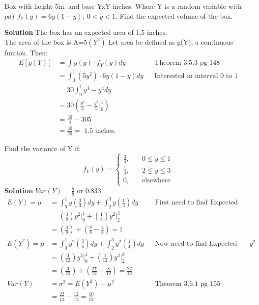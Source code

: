 \documentclass[12pt]{article}
\newenvironment{problem}[2][Problem]{\begin{trivlist}
\item[\hskip \labelsep {\bfseries #1}\hskip \labelsep {\bfseries #2.}]}{\end{trivlist}}
\begin{document}
\begin{problem}{3.5.32} Box with height 5in. and base YxY inches. Where Y is a random variable with $pdf$ $f_Y(y)=6y(1-y), \ 0 < y < 1$. Find the expected volume of the box. 
\\


\textbf{Solution} The box has an expected area of 1.5 inches. \\
The area of the box is A=$5(Y^2)$ Let area be defined as g(Y), a continuous funtion. Then: 
\begin{align*} 
E[g(Y)] &= \int g(y) \cdot f_Y(y) dy && \text{Theorem 3.5.3 pg 148} \\
&= \int_0^1 (5y^2)\cdot 6y(1-y) dy && \text{Interested in interval 0 to 1}\\
&= 30\int_0^1 y^3 -y^4 dy \\
&= 30 ( \frac{y^4}{4} - \frac{y^5}{5} \Big|_0^1 ) \\
&= \frac{30}{4} - {30}{5} \\
&= \frac{30}{20} = \text{ 1.5 inches.}
\end{align*}
\end{problem}

\begin{problem}{3.6.2} Find the variance of Y if: 
$$
f_Y(y) = \left\{
        \begin{array}{ll}
            \frac{3}{4}, & \quad 0 \leq y \leq 1 \\
            \frac{1}{4}, & \quad 2 \leq y \leq 3 \\
		0,  & \quad \text{elsewhere}
        \end{array}
    \right.
$$
\textbf{Solution} $Var(Y) = \frac{5}{8}$ or 0.833. 
\begin{align*} 
E(Y) = \mu &= \int_0^1 y(\frac{3}{4}) dy + \int_2^3y(\frac{1}{4})dy && \text{First need to find Expected value of y}\\
&= (\frac{3}{8})y^2 \Big|_0^1 + (\frac{1}{8})y^2 \Big|_2^3  \\
&= (\frac{3}{8}) + (\frac{9}{8} - \frac{4}{8}) = 1 \\
E(Y^2) = \mu &= \int_0^1 y^2(\frac{3}{4}) dy + \int_2^3y^2(\frac{1}{4})dy && \text{Now need to find Expected value of $y^2$}\\
&= (\frac{3}{12})y^3 \Big|_0^1 + (\frac{1}{12})y^3 \Big|_2^3 \\
&= (\frac{3}{12}) + (\frac{27}{12}-\frac{8}{12}) = \frac{22}{12}\\
Var(Y) & = \sigma^2 = E(Y^2)-\mu^2 && \text{Theorem 3.6.1 pg 155} \\
&= \frac{22}{12} - \frac{12}{12} = \frac{10}{12}
\end{align*}
\end{problem} 
\end{document}
